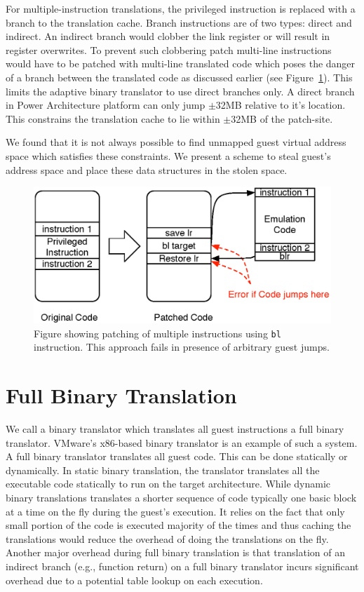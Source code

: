 For multiple-instruction translations, the privileged instruction is replaced with a branch to the translation cache. Branch instructions are of two types: direct and indirect. An indirect branch would clobber the link register or will result in register overwrites. To prevent such clobbering patch multi-line instructions would have to be patched with multi-line translated code which poses the danger of a branch between the translated code as discussed earlier (see Figure~\ref{fig:multiple_insns_patching}). This limits the adaptive binary translator to use direct branches only. A direct branch in Power Architecture platform can only jump $\pm$32MB relative to it's location. This constrains the translation cache to lie within $\pm$32MB of the patch-site.

We found that it is not always possible to find unmapped guest virtual address space which satisfies these constraints. We present a scheme to steal guest’s address space and place these data structures in the stolen space.

\begin{figure}
\centering
\includegraphics[scale=0.5]{multiple_ins_patching.eps}
\caption{\label{fig:multiple_insns_patching}Figure showing patching of multiple instructions using {\tt bl} instruction. This approach fails in presence of arbitrary guest jumps.}
\end{figure}

\section{Full Binary Translation}
\label{full_binary_translation}
We call a binary translator which translates all guest instructions a full binary translator. VMware’s x86-based binary translator\cite{adams:asplos06} is an example of such a system. A full binary translator translates all guest code. This can be done statically or dynamically. In static binary translation, the translator translates all the executable code statically to run on the target architecture. While dynamic binary translations translates a shorter sequence of code typically one basic block at a time on the fly during the guest's execution. It relies on the fact that only small portion of the code is executed majority of the times and thus caching the translations would reduce the overhead of doing the translations on the fly. Another major overhead during full binary translation is that translation of an indirect branch (e.g., function return) on a full binary translator incurs significant overhead due to a potential table lookup on each execution.

